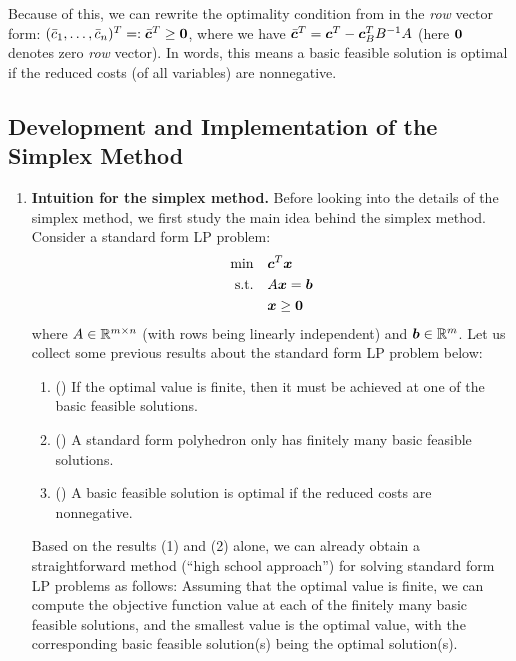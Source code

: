 \begin{enumerate}
Because of this, we can rewrite the optimality condition from
 in the \emph{row} vector form:
\((\bar{c}_{1},\dotsc,\bar{c}_{n})^{T}=:\bar{\bm{c}}^{T}\ge\bm{0}\), where
we have \(\bar{\bm{c}}^{T}=\bm{c}^{T}-\bm{c}_{B}^{T}B^{-1}A\) (here
\(\bm{0}\) denotes zero \emph{row} vector). In words, this means a basic
feasible solution is optimal if the reduced costs (of all variables) are
nonnegative.
\end{enumerate}
\subsection{Development and Implementation of the Simplex Method}
\label{subsect:simplex-dev-implement}
\begin{enumerate}
\item \textbf{Intuition for the simplex method.}
Before looking into the details of the simplex method, we
first study the main idea behind the simplex method.  Consider
a standard form LP problem:
\begin{align*}
\text{min}\quad&\bm{c}^{T}\bm{x} \\
\text{s.t.}\quad&A\bm{x}=\bm{b} \\
&\bm{x}\ge \bm{0}
\end{align*}
where \(A\in\mathbb{R}^{m\times n}\) (with rows being linearly independent) and
\(\bm{b}\in\mathbb{R}^m\).
Let us collect some previous results about the standard form LP problem below:
\begin{enumerate}[label={(\arabic*)}]
\item () If the optimal value is finite, then it must be achieved at one of the
basic feasible solutions.
\item () A standard form polyhedron only has finitely many basic feasible solutions.
\item () A basic feasible solution is optimal if the
reduced costs are nonnegative.
\end{enumerate}
Based on the results (1) and (2) alone, we can already obtain a straightforward
method (``high school approach'') for solving standard form LP problems as
follows: Assuming that the optimal value is finite, we can compute the
objective function value at each of the finitely many basic feasible solutions,
and the smallest value is the optimal value, with the corresponding basic
feasible solution(s) being the optimal solution(s).


\end{enumerate}
